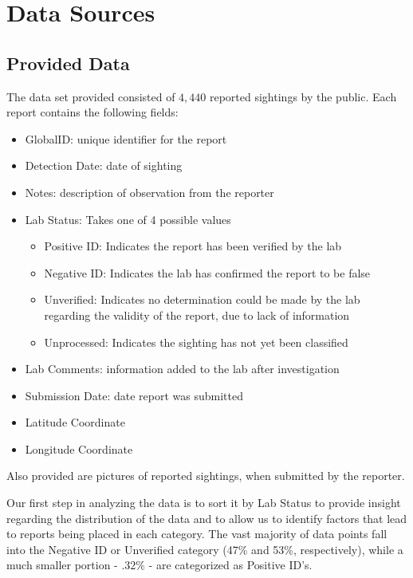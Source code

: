 \documentclass[letterpaper]{article}
\begin{document}
\section{Data Sources}
\subsection{Provided Data}
The data set provided consisted of $4,440$ reported sightings by the public. Each report contains the following fields:


\begin{itemize}
    \item GlobalID: unique identifier for the report
    \item Detection Date: date of sighting 
    \item Notes: description of observation from the reporter
    \item Lab Status: Takes one of 4 possible values
    \begin{itemize}
        \item Positive ID: Indicates the report has been verified by the lab
        \item Negative ID: Indicates the lab has confirmed the report to be false
        \item Unverified: Indicates no determination could be made by the lab regarding the validity of the report, due to lack of information
        \item Unprocessed: Indicates the sighting has not yet been classified
    \end{itemize}
    \item Lab Comments: information added to the lab after investigation
    \item Submission Date: date report was submitted
    \item Latitude Coordinate
    \item Longitude Coordinate
    
\end{itemize}


\begin{flushleft}
Also provided are pictures of reported sightings, when submitted by the reporter.

Our first step in analyzing the data is to sort it by Lab Status to provide insight regarding the distribution of the data and to allow us to identify factors that lead to reports being placed in each category. The vast majority of data points fall into the Negative ID or Unverified category (47\% and 53\%, respectively), while a much smaller portion - $.32\%$ - are categorized as Positive ID's.

\end{flushleft}
\end{document}
